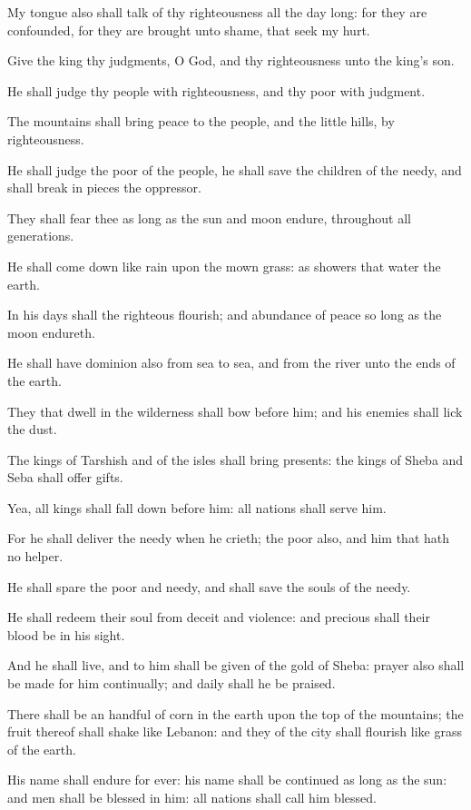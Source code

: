 \Verse My tongue also shall talk of thy righteousness all the day long: for they are confounded, for they are brought unto shame, that seek my hurt.




\Chapter
\Verse Give the king thy judgments, O God, and thy righteousness unto the king's son.

\Verse He shall judge thy people with righteousness, and thy poor with judgment.

\Verse The mountains shall bring peace to the people, and the little hills, by righteousness.

\Verse He shall judge the poor of the people, he shall save the children of the needy, and shall break in pieces the oppressor.

\Verse They shall fear thee as long as the sun and moon endure, throughout all generations.

\Verse He shall come down like rain upon the mown grass: as showers that water the earth.

\Verse In his days shall the righteous flourish; and abundance of peace so long as the moon endureth.

\Verse He shall have dominion also from sea to sea, and from the river unto the ends of the earth.

\Verse They that dwell in the wilderness shall bow before him; and his enemies shall lick the dust.

\Verse The kings of Tarshish and of the isles shall bring presents: the kings of Sheba and Seba shall offer gifts.

\Verse Yea, all kings shall fall down before him: all nations shall serve him.

\Verse For he shall deliver the needy when he crieth; the poor also, and him that hath no helper.

\Verse He shall spare the poor and needy, and shall save the souls of the needy.

\Verse He shall redeem their soul from deceit and violence: and precious shall their blood be in his sight.

\Verse And he shall live, and to him shall be given of the gold of Sheba: prayer also shall be made for him continually; and daily shall he be praised.

\Verse There shall be an handful of corn in the earth upon the top of the mountains; the fruit thereof shall shake like Lebanon: and they of the city shall flourish like grass of the earth.

\Verse His name shall endure for ever: his name shall be continued as long as the sun: and men shall be blessed in him: all nations shall call him blessed.

